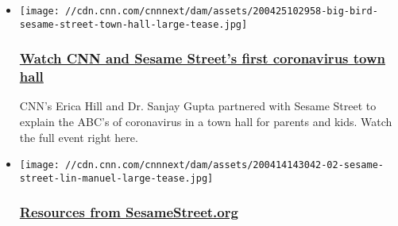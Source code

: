 \begin{itemize}
\item
  \href{/2020/04/25/app-news-section/cnn-sesame-street-coronavirus-town-hall-april-25-2020-app/index.html}{}

  \texttt{[image: //cdn.cnn.com/cnnnext/dam/assets/200425102958-big-bird-sesame-street-town-hall-large-tease.jpg]}

  \hypertarget{watch-cnn-and-sesame-streets-first-coronavirus-town-hall}{%
  \subsubsection{\texorpdfstring{\href{/2020/04/25/app-news-section/cnn-sesame-street-coronavirus-town-hall-april-25-2020-app/index.html}{\textbf{Watch
  CNN and Sesame Street's first coronavirus town
  hall}}}{Watch CNN and Sesame Street's first coronavirus town hall}}\label{watch-cnn-and-sesame-streets-first-coronavirus-town-hall}}

  CNN's Erica Hill and Dr. Sanjay Gupta partnered with Sesame Street to
  explain the ABC's of coronavirus in a town hall for parents and kids.
  Watch the full event right here.
\item
  \href{https://www.sesamestreet.org/caring}{}

  \texttt{[image: //cdn.cnn.com/cnnnext/dam/assets/200414143042-02-sesame-street-lin-manuel-large-tease.jpg]}

  \hypertarget{resources-from-sesamestreetorg}{%
  \subsubsection{\texorpdfstring{\href{https://www.sesamestreet.org/caring}{\textbf{Resources
  from
  SesameStreet.org}}}{Resources from SesameStreet.org}}\label{resources-from-sesamestreetorg}}


\end{itemize}

